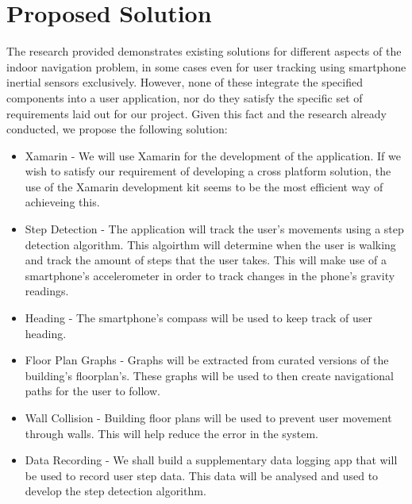 \documentclass[main.tex]{subfiles}
\begin{document}
\section{Proposed Solution}

The research provided demonstrates existing solutions for different aspects of the indoor navigation problem, in some cases even for user tracking using smartphone inertial sensors exclusively. However, none of these integrate the specified components into a user application, nor do they satisfy the specific set of requirements laid out for our project. 
Given this fact and the research already conducted, we propose the following solution:

\begin{itemize}

\item Xamarin - We will use Xamarin for the development of the application. If we wish to satisfy our requirement of developing a cross platform solution, the use of the Xamarin development kit seems to be the most efficient way of achieveing this.

\item Step Detection - The application will track the user's movements using a step detection algorithm. This algoirthm will determine when the user is walking and track the amount of steps that the user takes. This will make use of a smartphone's accelerometer in order to track changes in the phone's gravity readings.

\item Heading - The smartphone's compass will be used to keep track of user heading.

\item Floor Plan Graphs - Graphs will be extracted from curated versions of the building's floorplan's. These graphs will be used to then create navigational paths for the user to follow.

\item Wall Collision - Building floor plans will be used to prevent user movement through walls. This will help reduce the error in the system.

\item Data Recording - We shall build a supplementary data logging app that will be used to record user step data. This data will be analysed and used to develop the step detection algorithm.

\end{itemize}
\end{document}
